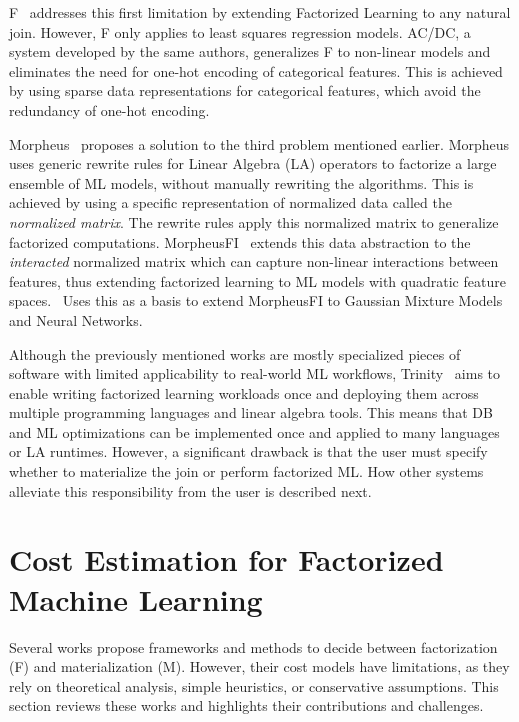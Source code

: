 F~\cite{f_schleich} addresses this first limitation by extending Factorized Learning to any natural join. However, F only applies to least squares regression models. AC/DC, a system developed by the same authors, generalizes F to non-linear models and eliminates the need for one-hot encoding of categorical features. This is achieved by using sparse data representations for categorical features, which avoid the redundancy of one-hot encoding.

Morpheus~\cite{morpheus} proposes a solution to the third problem mentioned earlier. Morpheus uses generic rewrite rules for Linear Algebra (LA) operators to factorize a large ensemble of ML models, without manually rewriting the algorithms. This is achieved by using a specific representation of normalized data called the \textit{normalized matrix}. The rewrite rules apply this normalized matrix to generalize factorized computations. MorpheusFI~\cite{MorpheusFI} extends this data abstraction to the \textit{interacted} normalized matrix which can capture non-linear interactions between features, thus extending factorized learning to ML models with quadratic feature spaces.~\cite{f_gmm_DBLP:conf/icde/ChengKZ021} Uses this as a basis to extend MorpheusFI to Gaussian Mixture Models and Neural Networks.

Although the previously mentioned works are mostly specialized pieces of software with limited applicability to real-world ML workflows, Trinity~\cite{TrinityPolyglotFrameworkFactorized2021} aims to enable writing factorized learning workloads once and deploying them across multiple programming languages and linear algebra tools. This means that DB and ML optimizations can be implemented once and applied to many languages or LA runtimes. However, a significant drawback is that the user must specify whether to materialize the join or perform factorized ML. How other systems alleviate this responsibility from the user is described next.

\section{Cost Estimation for Factorized Machine Learning}
\label{sec:3-cost-estimation-for-factorized-ml}
Several works propose frameworks and methods to decide between factorization (F) and materialization (M). However, their cost models have limitations, as they rely on theoretical analysis, simple heuristics, or conservative assumptions. This section reviews these works and highlights their contributions and challenges.

